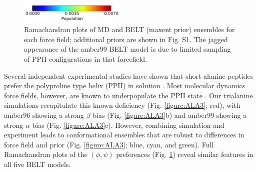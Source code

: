 \documentclass[11pt,titlepage]{article}
\begin{document}
\begin{figure}
\includegraphics[width=5.05cm]{figures/ALA3_rama_colorbar.pdf}


\caption{
Ramachandran plots of MD and BELT (maxent prior) ensembles for each force field; additional priors are shown in Fig. S1.  The jagged appearance of the amber99 BELT model is due to limited sampling of PPII configurations in that forcefield.  
}
\label{figure:Rama}
\end{figure}

Several independent experimental studies have shown that short alanine peptides prefer the polyproline type helix (PPII) in solution  \citep{Grdadolnik2011, Graf2007, Avbelj2006}.  Most molecular dynamics force fields, however, are known to underpopulate the PPII state  \citep{Graf2007,beauchamp2012protein, nerenberg2011, best2008}.  Our trialanine simulations recapitulate this known deficiency (Fig. \ref{figure:ALA3}; red), with amber96 showing a strong $\beta$ bias (Fig. \ref{figure:ALA3}b) and amber99 showing a strong $\alpha$ bias (Fig. \ref{figure:ALA3}c).  However, combining simulation and experiment leads to conformational ensembles that are robust to differences in force field and prior (Fig. \ref{figure:ALA3}; blue, cyan, and green).  Full Ramachandran plots of the $(\phi, \psi)$ preferences (Fig. \ref{figure:Rama}) reveal similar features in all five BELT models.  
\end{document}

